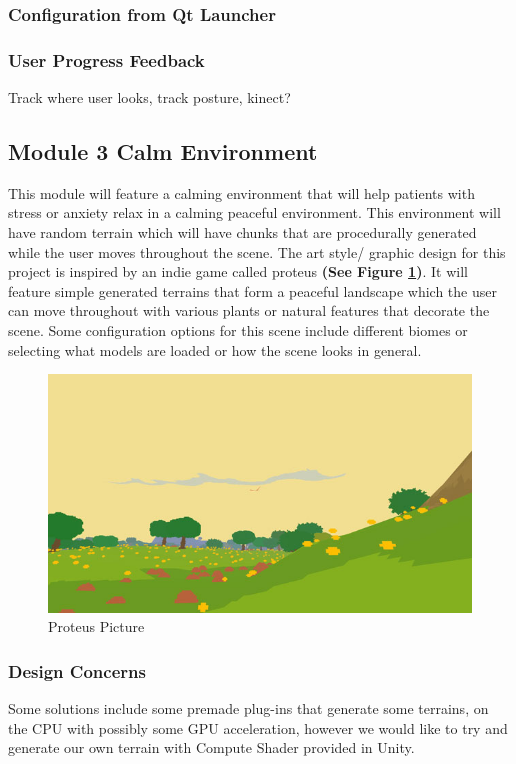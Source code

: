 \documentclass[a4paper,10pt]{article}
\begin{document}
\subsubsection{Configuration from Qt Launcher}

\subsubsection{User Progress Feedback}
Track where user looks, track posture, kinect?
\pagebreak
\subsection{Module 3 Calm Environment} %
This module will feature a calming environment that will help patients with stress or anxiety relax in a calming peaceful environment. This environment will have random terrain which will have chunks 
that are procedurally generated while the user moves throughout the scene.  The art style/ graphic design for this project is inspired by an indie game called proteus \textbf{(See Figure \ref{fig:proteus})}. 
It will feature simple generated terrains that form a  peaceful landscape which the user can move throughout with various plants or natural features that decorate the scene. 
Some configuration options for this scene include different biomes or selecting what models are loaded or how the scene looks in general. 

\begin{figure}[H]
	\centerline{\includegraphics[scale= 0.4]{proteus.jpg}}
	\caption{Proteus Picture}
	\label{fig:proteus}
\end{figure}
\subsubsection{Design Concerns}
Some solutions include some premade plug-ins that generate some terrains, on the CPU with possibly some GPU acceleration, however we would like to try and generate our own
terrain with Compute Shader provided in Unity.
\end{document}
